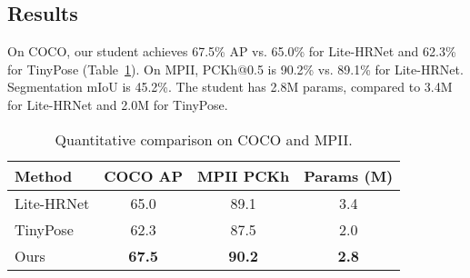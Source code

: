 \documentclass{article}
\begin{document}
\subsection{Results}
On COCO, our student achieves 67.5\% AP vs. 65.0\% for Lite-HRNet and 62.3\% for TinyPose (Table~\ref{tab:quant}). On MPII, PCKh@0.5 is 90.2\% vs. 89.1\% for Lite-HRNet. Segmentation mIoU is 45.2\%. The student has 2.8M params, compared to 3.4M for Lite-HRNet and 2.0M for TinyPose.

\begin{table}[h]
\centering
\begin{tabular}{lccc}
\hline
Method & COCO AP & MPII PCKh & Params (M) \\
\hline
Lite-HRNet & 65.0 & 89.1 & 3.4 \\
TinyPose    & 62.3 & 87.5 & 2.0 \\
Ours        & \textbf{67.5} & \textbf{90.2} & \textbf{2.8} \\
\hline
\end{tabular}
\caption{Quantitative comparison on COCO and MPII.}
\label{tab:quant}
\end{table}
\end{document}
